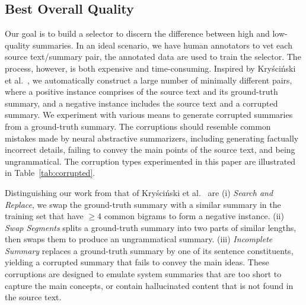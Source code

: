 \documentclass[11pt]{article}
\begin{document}
\subsection{Best Overall Quality}


Our goal is to build a selector to discern the difference between high and low-quality summaries.
In an ideal scenario, we have human annotators to vet each source text/summary pair, the annotated data are used to train the selector. The process, however, is both expensive and time-consuming. 
Inspired by Kryściński et al.~, we automatically construct a large number of minimally different pairs, where a positive instance comprises of the source text and its ground-truth summary, and a negative instance includes the source text and a corrupted summary.
We experiment with various means to generate corrupted summaries from a ground-truth summary. 
The corruptions should resemble common mistakes made by neural abstractive summarizers, including generating factually incorrect details, failing to convey the main points of the source text, and being ungrammatical. 
The corruption types experimented in this paper are illustrated in Table~\ref{tab:corrupted}.


Distinguishing our work from that of Kryściński et al.~ are
(i) \emph{Search and Replace}, we swap the ground-truth summary with a similar summary in the training set that have $\ge$4 common bigrams to form a negative instance.
(ii) \emph{Swap Segments} splits a ground-truth summary into two parts of similar lengths, then swaps them to produce an ungrammatical summary.
(iii) \emph{Incomplete Summary} replaces a ground-truth summary by one of its sentence constituents, yielding a corrupted summary that fails to convey the main ideas.
These corruptions are designed to emulate system summaries that are too short to capture the main concepts, or contain hallucinated content that is not found in the source text.
\end{document}
